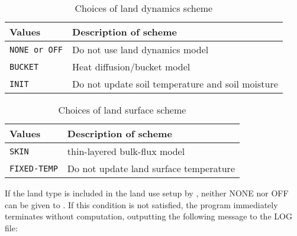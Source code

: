 \begin{table}[hbt]
\begin{center}
  \caption{Choices of land dynamics scheme}
  \label{tab:nml_land_dyn}
  \begin{tabularx}{150mm}{lX} \hline
    \rowcolor[gray]{0.9}  Values & Description of scheme \\ \hline
      \verb|NONE or OFF| & Do not use land dynamics model \\
      \verb|BUCKET|      & Heat diffusion/bucket model \\
      \verb|INIT|        & Do not update soil temperature and soil moisture \\
    \hline
  \end{tabularx}
\end{center}
\end{table}
\begin{table}[hbt]
\begin{center}
  \caption{Choices of land surface scheme}
  \label{tab:nml_land_sfc}
  \begin{tabularx}{150mm}{lX} \hline
    \rowcolor[gray]{0.9}  Values & Description of scheme \\ \hline
      \verb|SKIN|       & thin-layered bulk-flux model \\
      \verb|FIXED-TEMP| & Do not update land surface temperature \\
    \hline
  \end{tabularx}
\end{center}
\end{table}

If the land type is included in the land use setup by , neither NONE nor OFF can be given to . If this condition is not satisfied, the program immediately terminates without computation, outputting the following message to the LOG file:

